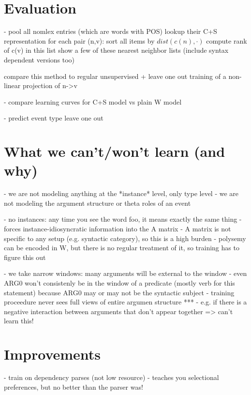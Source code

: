 \documentclass[11pt,letterpaper]{article}
\begin{document}
\section{Evaluation} %
- pool all nomlex entries (which are words with POS)
	lookup their C+S representation
	for each pair (n,v):
		sort all items by $dist(c(n), \cdot)$
		compute rank of c(v) in this list
	show a few of these nearest neighbor lists (include syntax dependent versions too)

	compare this method to regular unsupervised + leave one out training of a non-linear projection of n->v

- compare learning curves for C+S model vs plain W model

- predict event type leave one out




\section{What we can't/won't learn (and why)} %
\label{section:unlearnability}
- we are not modeling anything at the *instance* level, only type level
- we are not modeling the argument structure or theta roles of an event

- no instances: any time you see the word foo, it means exactly the same thing
	- forces instance-idiosyncratic information into the A matrix
	- A matrix is not specific to any setup (e.g. syntactic category), so this is a high burden
	- polysemy can be encoded in W, but there is no regular treatment of it, so training has to figure this out

- we take narrow windows: many arguments will be external to the window
	- even ARG0 won't consistenly be in the window of a predicate (mostly verb for this statement)
		because ARG0 may or may not be the syntactic subject
	- training proceedure never sees full views of entire argumen structure
	***	- e.g. if there is a negative interaction between arguments that don't appear together => can't learn this!


\section{Improvements}

- train on dependency parses (not low resource)
	- teaches you selectional preferences, but no better than the parser was!
\end{document}
